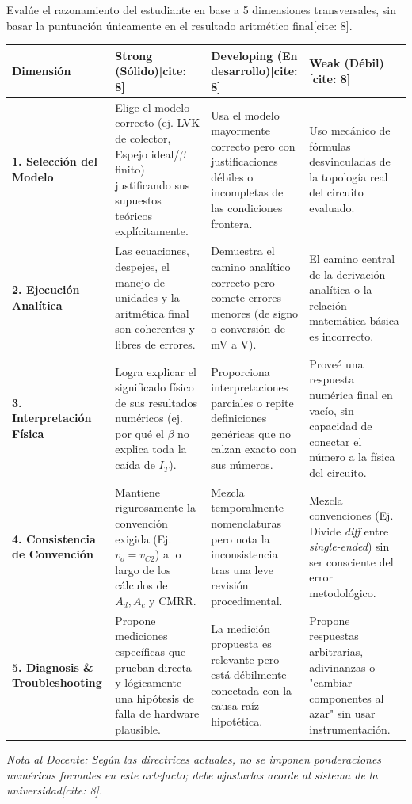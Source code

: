 \documentclass[11pt, a4paper]{article}
\begin{document}
\begin{tcolorbox}[colback=ucbblue!5, colframe=ucbblue, title=\textbf{Rúbrica Analítica de Evaluación — EC2 (BJT / Par Diferencial)}]
    Evalúe el razonamiento del estudiante en base a 5 dimensiones transversales, sin basar la puntuación únicamente en el resultado aritmético final[cite: 8].
\end{tcolorbox}

\renewcommand{\arraystretch}{1.8}
\begin{tabularx}{\textwidth}{|>{\raggedright\arraybackslash}p{2.5cm}|>{\raggedright\arraybackslash}X|>{\raggedright\arraybackslash}X|>{\raggedright\arraybackslash}X|}
\hline
\rowcolor{ucbblue!20}
\textbf{Dimensión} & \textbf{Strong (Sólido)[cite: 8]} & \textbf{Developing (En desarrollo)[cite: 8]} & \textbf{Weak (Débil)[cite: 8]} \\ \hline
\textbf{1. Selección del Modelo} & Elige el modelo correcto (ej. LVK de colector, Espejo ideal/$\beta$ finito) justificando sus supuestos teóricos explícitamente. & Usa el modelo mayormente correcto pero con justificaciones débiles o incompletas de las condiciones frontera. & Uso mecánico de fórmulas desvinculadas de la topología real del circuito evaluado. \\ \hline
\textbf{2. Ejecución Analítica} & Las ecuaciones, despejes, el manejo de unidades y la aritmética final son coherentes y libres de errores. & Demuestra el camino analítico correcto pero comete errores menores (de signo o conversión de mV a V). & El camino central de la derivación analítica o la relación matemática básica es incorrecto. \\ \hline
\textbf{3. Interpretación Física} & Logra explicar el significado físico de sus resultados numéricos (ej. por qué el $\beta$ no explica toda la caída de $I_T$). & Proporciona interpretaciones parciales o repite definiciones genéricas que no calzan exacto con sus números. & Proveé una respuesta numérica final en vacío, sin capacidad de conectar el número a la física del circuito. \\ \hline
\textbf{4. Consistencia de Convención} & Mantiene rigurosamente la convención exigida (Ej. $v_o=v_{C2}$) a lo largo de los cálculos de $A_d, A_c$ y CMRR. & Mezcla temporalmente nomenclaturas pero nota la inconsistencia tras una leve revisión procedimental. & Mezcla convenciones (Ej. Divide \textit{diff} entre \textit{single-ended}) sin ser consciente del error metodológico. \\ \hline
\textbf{5. Diagnosis \& Troubleshooting} & Propone mediciones específicas que prueban directa y lógicamente una hipótesis de falla de hardware plausible. & La medición propuesta es relevante pero está débilmente conectada con la causa raíz hipotética. & Propone respuestas arbitrarias, adivinanzas o "cambiar componentes al azar" sin usar instrumentación. \\ \hline
\end{tabularx}

\vspace{0.5cm}
\textit{Nota al Docente: Según las directrices actuales, no se imponen ponderaciones numéricas formales en este artefacto; debe ajustarlas acorde al sistema de la universidad[cite: 8].}
\end{document}
